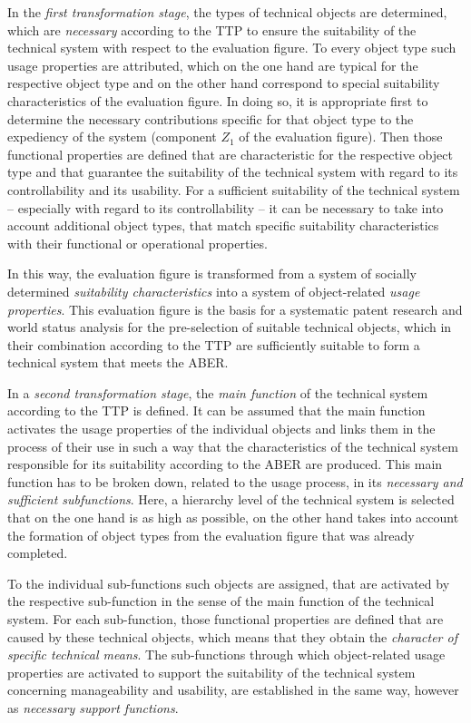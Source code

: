 \documentclass[11pt,a4paper]{article}
\begin{document}
In the \emph{first transformation stage}, the types of technical objects are
determined, which are \emph{necessary} according to the TTP to ensure the
suitability of the technical system with respect to the evaluation figure.  To
every object type such usage properties are attributed, which on the one hand
are typical for the respective object type and on the other hand correspond to
special suitability characteristics of the evaluation figure. In doing so, it
is appropriate first to determine the necessary contributions specific for
that object type to the expediency of the system (component $Z_1$ of the
evaluation figure). Then those functional properties are defined that are
characteristic for the respective object type and that guarantee the
suitability of the technical system with regard to its controllability and its
usability. For a sufficient suitability of the technical system -- especially
with regard to its controllability -- it can be necessary to take into account
additional object types, that match specific suitability characteristics with
their functional or operational properties.

In this way, the evaluation figure is transformed from a system of socially
determined \emph{suitability characteristics} into a system of object-related
\emph{usage properties}. This evaluation figure is the basis for a systematic
patent research and world status analysis for the pre-selection of suitable
technical objects, which in their combination according to the TTP are
sufficiently suitable to form a technical system that meets the ABER.

In a \emph{second transformation stage}, the \emph{main function} of the
technical system according to the TTP is defined. It can be assumed that the
main function activates the usage properties of the individual objects and
links them in the process of their use in such a way that the characteristics
of the technical system responsible for its suitability according to the ABER
are produced.  This main function has to be broken down, related to the usage
process, in its \emph{necessary and sufficient subfunctions}. Here, a
hierarchy level of the technical system is selected that on the one hand is as
high as possible, on the other hand takes into account the formation of object
types from the evaluation figure that was already completed.

To the individual sub-functions such objects are assigned, that are activated
by the respective sub-function in the sense of the main function of the
technical system. For each sub-function, those functional properties are
defined that are caused by these technical objects, which means that they
obtain the \emph{character of specific technical means}. The sub-functions
through which object-related usage properties are activated to support the
suitability of the technical system concerning manageability and usability,
are established in the same way, however as \emph{necessary support
  functions}.
\end{document}
